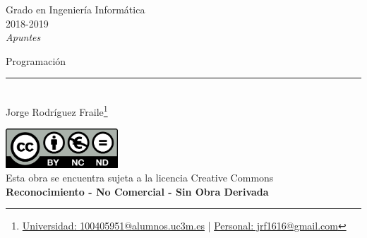 \documentclass[12pt, twoside, openright]{report} %
\begin{document}
	
\begin{titlepage}
	\begin{sffamily}
	\color{azulUC3M}
	\begin{center}
		\begin{figure}[H] %
		\end{figure}
		\vspace{2.5cm}
		\begin{Large}
			Grado en Ingeniería Informática\\			
			2018-2019\\
			\vspace{2cm}		
			\textsl{Apuntes}\\
			\bigskip
		\end{Large}
		 	{\Huge Programación}\\
		 	\vspace*{0.5cm}
	 		\rule{10.5cm}{0.1mm}\\
			\vspace*{0.9cm}
			{\LARGE Jorge Rodríguez Fraile\footnote{\href{mailto:100405951@alumnos.uc3m.es}{Universidad: 100405951@alumnos.uc3m.es}  |  \href{mailto:jrf1616@gmail.com}{Personal: jrf1616@gmail.com}}}\\ 
			\vspace*{1cm}
	\end{center}
	\vfill
	\color{black}
		\includegraphics[width=4.2cm]{img/creativecommons.png}\\
		Esta obra se encuentra sujeta a la licencia Creative Commons\\ \textbf{Reconocimiento - No Comercial - Sin Obra Derivada}
	\end{sffamily}
\end{titlepage}


\tableofcontents
\thispagestyle{fancy}
\end{document}
